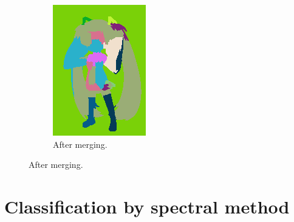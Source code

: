 \documentclass{beamer}
\begin{document}
\begin{frame}
\begin{figure}[htb!]
\begin{subfigure}{0.3\textwidth}
\includegraphics[width=\textwidth]{../images/miku_seg_fused.png}
\caption{After merging.}
\end{subfigure}
\end{figure}
\end{frame}

\section{Classification by spectral method}
\end{document}
